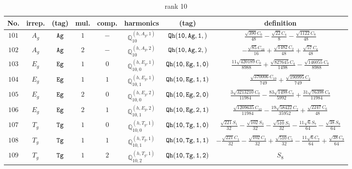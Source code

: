\documentclass[fleqn,8pt]{jsarticle}
\begin{document}
\begin{table}[ht!]
\begin{center}
\caption{rank 10}
\renewcommand{\arraystretch}{1.3}
\begin{tabular}{cccccccc} \hline \hline
No. & irrep. & (tag) & mul. & comp. & harmonics & (tag) & definition \\ \hline
$ 101 $ & $ A_{g} $ & $ {\tt Ag} $ & $ 1 $ & $ - $ & $ \mathbb{Q}_{10}^{(h,A_{g},1)} $ & $ {\tt Qh(10,Ag,1,)} $ & $ \frac{\sqrt{390} C_{0}}{48} - \frac{\sqrt{22} C_{4}}{8} - \frac{\sqrt{1122} C_{8}}{48} $ \\
$ 102 $ & $ A_{g} $ & $ {\tt Ag} $ & $ 2 $ & $ - $ & $ \mathbb{Q}_{10}^{(h,A_{g},2)} $ & $ {\tt Qh(10,Ag,2,)} $ & $ - \frac{\sqrt{85} C_{10}}{16} + \frac{\sqrt{1482} C_{2}}{48} + \frac{\sqrt{57} C_{6}}{48} $ \\
$ 103 $ & $ E_{g} $ & $ {\tt Eg} $ & $ 1 $ & $ 0 $ & $ \mathbb{Q}_{10,0}^{(h,E_{g},1)} $ & $ {\tt Qh(10,Eg,1,0)} $ & $ \frac{11 \sqrt{420189} C_{0}}{8988} + \frac{\sqrt{827645} C_{4}}{1498} - \frac{\sqrt{146055} C_{8}}{8988} $ \\
$ 104 $ & $ E_{g} $ & $ {\tt Eg} $ & $ 1 $ & $ 1 $ & $ \mathbb{Q}_{10,1}^{(h,E_{g},1)} $ & $ {\tt Qh(10,Eg,1,1)} $ & $ \frac{\sqrt{370006} C_{10}}{749} + \frac{\sqrt{190995} C_{2}}{749} $ \\
$ 105 $ & $ E_{g} $ & $ {\tt Eg} $ & $ 2 $ & $ 0 $ & $ \mathbb{Q}_{10,0}^{(h,E_{g},2)} $ & $ {\tt Qh(10,Eg,2,0)} $ & $ \frac{3 \sqrt{3213210} C_{0}}{11984} - \frac{83 \sqrt{1498} C_{4}}{5992} + \frac{31 \sqrt{76398} C_{8}}{11984} $ \\
$ 106 $ & $ E_{g} $ & $ {\tt Eg} $ & $ 2 $ & $ 1 $ & $ \mathbb{Q}_{10,1}^{(h,E_{g},2)} $ & $ {\tt Qh(10,Eg,2,1)} $ & $ \frac{\sqrt{1209635} C_{10}}{11984} - \frac{19 \sqrt{58422} C_{2}}{35952} + \frac{\sqrt{2247} C_{6}}{48} $ \\
$ 107 $ & $ T_{g} $ & $ {\tt Tg} $ & $ 1 $ & $ 0 $ & $ \mathbb{Q}_{10,0}^{(h,T_{g},1)} $ & $ {\tt Qh(10,Tg,1,0)} $ & $ \frac{\sqrt{221} S_{1}}{32} - \frac{\sqrt{102} S_{3}}{32} - \frac{\sqrt{510} S_{5}}{32} - \frac{11 \sqrt{6} S_{7}}{64} - \frac{\sqrt{38} S_{9}}{64} $ \\
$ 108 $ & $ T_{g} $ & $ {\tt Tg} $ & $ 1 $ & $ 1 $ & $ \mathbb{Q}_{10,1}^{(h,T_{g},1)} $ & $ {\tt Qh(10,Tg,1,1)} $ & $ - \frac{\sqrt{221} C_{1}}{32} - \frac{\sqrt{102} C_{3}}{32} + \frac{\sqrt{510} C_{5}}{32} - \frac{11 \sqrt{6} C_{7}}{64} + \frac{\sqrt{38} C_{9}}{64} $ \\
$ 109 $ & $ T_{g} $ & $ {\tt Tg} $ & $ 1 $ & $ 2 $ & $ \mathbb{Q}_{10,2}^{(h,T_{g},1)} $ & $ {\tt Qh(10,Tg,1,2)} $ & $ S_{8} $ \\

\end{tabular}
\end{center}
\end{table}
\end{document}
